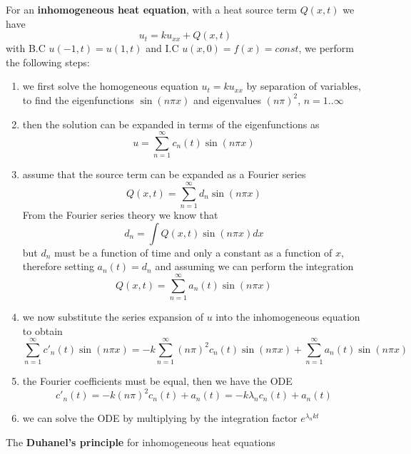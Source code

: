 \documentclass[12pt]{paper}
\begin{document}
For an \textbf{inhomogeneous heat equation}, with a heat source term $Q(x,t)$ we have 
\begin{equation*}
u_t=ku_{xx}+Q(x,t)
\end{equation*}
with B.C $u(-1,t)=u(1,t)$ and I.C $u(x,0)=f(x)=const$, we perform the following steps:
\begin{enumerate}
\item we first solve the homogeneous equation $u_t=ku_{xx}$ by separation of variables, to find the eigenfunctions $\sin(n\pi x)$ and eigenvalues $(n\pi)^2$, $n=1..\infty$
\item then the solution can be expanded in terms of the eigenfunctions as 
\begin{equation*}
u=\sum_{n=1}^{\infty}c_n(t)\sin(n\pi x)
\end{equation*}
\item assume that the source term can be expanded as a Fourier series
\begin{equation*}
Q(x,t)= \sum_{n=1}^{\infty}d_n\sin(n\pi x)
\end{equation*}
From the Fourier series theory we know that 
\begin{equation*}
d_n=\int Q(x,t)\sin(n\pi x)dx
\end{equation*}
but $d_n$ must be a function of time and only a constant as a function of $x$, therefore setting $a_n(t) = d_n$ and assuming we can perform the integration 
\begin{equation*}
Q(x,t) = \sum_{n=1}^{\infty}a_n(t)\sin(n\pi x)
\end{equation*}
\item we now substitute the series expansion of $u$ into the inhomogeneous equation to obtain 
\begin{equation*}
\sum_{n=1}^{\infty}c'_n(t)\sin(n\pi x)=-k\sum_{n=1}^{\infty}(n\pi)^2c_n(t)\sin(n\pi x)+\sum_{n=1}^{\infty}a_n(t)\sin(n\pi x)
\end{equation*}
\item the Fourier coefficients must be equal, then we have the ODE
\begin{equation*}
c'_n(t)= -k(n\pi)^2 c_n(t)+a_n(t)=-k\lambda_n c_n(t)+a_n(t)
\end{equation*}
\item we can solve the ODE by multiplying by the integration factor $e^{\lambda_n k t}$
\end{enumerate}

The \textbf{Duhanel's principle} for inhomogeneous heat equations



\end{document}
